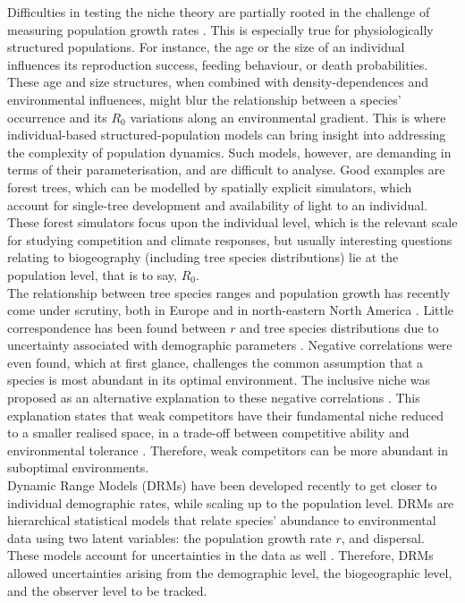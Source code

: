 Difficulties in testing the niche theory are partially rooted in the challenge of measuring population growth rates \citep{McGill2012}. This is especially true for physiologically structured populations. For instance, the age or the size of an individual influences its reproduction success, feeding behaviour, or death probabilities. These age and size structures, when combined with density-dependences and environmental influences, might blur the relationship between a species' occurrence and its $ R_0 $ variations along an environmental gradient. This is where individual-based structured-population models can bring insight into addressing the complexity of population dynamics. Such models, however, are demanding in terms of their parameterisation, and are difficult to analyse. Good examples are forest trees, which can be modelled by spatially explicit simulators, which account for single-tree development and availability of light to an individual. These forest simulators focus upon the individual level, which is the relevant scale for studying competition and climate responses, but usually interesting questions relating to biogeography (including tree species distributions) lie at the population level, that is to say, $ R_0 $. \\

The relationship between tree species ranges and population growth has recently come under scrutiny, both in Europe \citep{Thuiller2014} and in north-eastern North America \citep{McGill2012}. Little correspondence has been found between $ r $ and tree species distributions due to uncertainty associated with demographic parameters \citep{Thuiller2014}. Negative correlations were even found, which at first glance, challenges the common assumption that a species is most abundant in its optimal environment. The inclusive niche was proposed as an alternative explanation to these negative correlations \citep{McGill2012}. This explanation states that weak competitors have their fundamental niche reduced to a smaller realised space, in a trade-off between competitive ability and environmental tolerance \citep{Serrano2015}. Therefore, weak competitors can be more abundant in suboptimal environments. \\

Dynamic Range Models (DRMs) have been developed recently to get closer to individual demographic rates, while scaling up to the population level. DRMs are hierarchical statistical models that relate species' abundance to environmental data using two latent variables: the population growth rate $ r $, and dispersal. These models account for uncertainties in the data as well \citep{Pagel2012}. Therefore, DRMs allowed uncertainties arising from the demographic level, the biogeographic level, and the observer level to be tracked. \\

